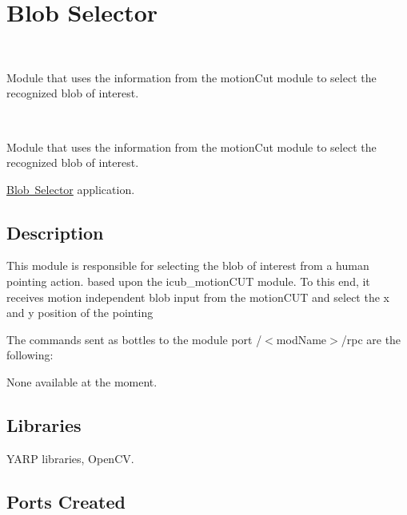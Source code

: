 \section{Blob Selector}
\label{group__icub__blobSelector}


~\newline


Module that uses the information from the motion\+Cut module to select the recognized blob of interest.  


~\newline


Module that uses the information from the motion\+Cut module to select the recognized blob of interest. 

\mbox{\hyperlink{group__icub__blobSelector}{Blob Selector}} application.\hypertarget{group__iolReachingCalibration_intro_sec}{}\subsection{Description}\label{group__iolReachingCalibration_intro_sec}
This module is responsible for selecting the blob of interest from a human pointing action. based upon the icub\+\_\+motion\+C\+UT module. To this end, it receives motion independent blob input from the motion\+C\+UT and select the x and y position of the pointing

The commands sent as bottles to the module port /$<$mod\+Name$>$/rpc are the following\+:

None available at the moment.\hypertarget{group__icub__iolStateMachineHandler_lib_sec}{}\subsection{Libraries}\label{group__icub__iolStateMachineHandler_lib_sec}

\begin{DoxyItemize}
\item Y\+A\+RP libraries, Open\+CV.
\end{DoxyItemize}\hypertarget{group__icub__iolStateMachineHandler_portsc_sec}{}\subsection{Ports Created}\label{group__icub__iolStateMachineHandler_portsc_sec}

